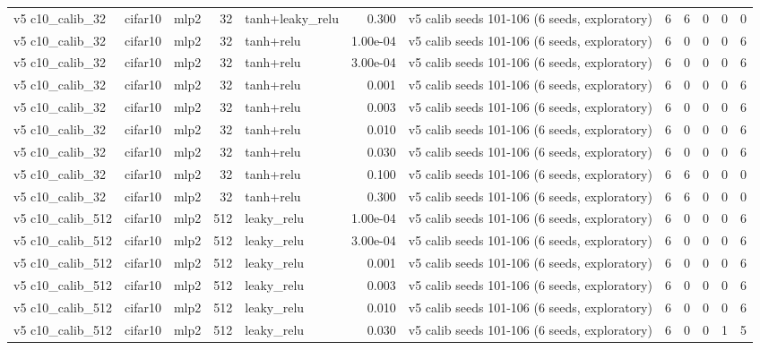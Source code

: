 \begin{table}[htbp]
{\begin{tabular}{@{}lllrlrlrrrrr@{}}
v5 c10\_calib\_32 & cifar10 & mlp2 & 32 & tanh+leaky\_relu & 0.300 & v5 calib seeds 101-106 (6 seeds, exploratory) & 6 & 6 & 0 & 0 & 0 \\
v5 c10\_calib\_32 & cifar10 & mlp2 & 32 & tanh+relu & 1.00e-04 & v5 calib seeds 101-106 (6 seeds, exploratory) & 6 & 0 & 0 & 0 & 6 \\
v5 c10\_calib\_32 & cifar10 & mlp2 & 32 & tanh+relu & 3.00e-04 & v5 calib seeds 101-106 (6 seeds, exploratory) & 6 & 0 & 0 & 0 & 6 \\
v5 c10\_calib\_32 & cifar10 & mlp2 & 32 & tanh+relu & 0.001 & v5 calib seeds 101-106 (6 seeds, exploratory) & 6 & 0 & 0 & 0 & 6 \\
v5 c10\_calib\_32 & cifar10 & mlp2 & 32 & tanh+relu & 0.003 & v5 calib seeds 101-106 (6 seeds, exploratory) & 6 & 0 & 0 & 0 & 6 \\
v5 c10\_calib\_32 & cifar10 & mlp2 & 32 & tanh+relu & 0.010 & v5 calib seeds 101-106 (6 seeds, exploratory) & 6 & 0 & 0 & 0 & 6 \\
v5 c10\_calib\_32 & cifar10 & mlp2 & 32 & tanh+relu & 0.030 & v5 calib seeds 101-106 (6 seeds, exploratory) & 6 & 0 & 0 & 0 & 6 \\
v5 c10\_calib\_32 & cifar10 & mlp2 & 32 & tanh+relu & 0.100 & v5 calib seeds 101-106 (6 seeds, exploratory) & 6 & 6 & 0 & 0 & 0 \\
v5 c10\_calib\_32 & cifar10 & mlp2 & 32 & tanh+relu & 0.300 & v5 calib seeds 101-106 (6 seeds, exploratory) & 6 & 6 & 0 & 0 & 0 \\
v5 c10\_calib\_512 & cifar10 & mlp2 & 512 & leaky\_relu & 1.00e-04 & v5 calib seeds 101-106 (6 seeds, exploratory) & 6 & 0 & 0 & 0 & 6 \\
v5 c10\_calib\_512 & cifar10 & mlp2 & 512 & leaky\_relu & 3.00e-04 & v5 calib seeds 101-106 (6 seeds, exploratory) & 6 & 0 & 0 & 0 & 6 \\
v5 c10\_calib\_512 & cifar10 & mlp2 & 512 & leaky\_relu & 0.001 & v5 calib seeds 101-106 (6 seeds, exploratory) & 6 & 0 & 0 & 0 & 6 \\
v5 c10\_calib\_512 & cifar10 & mlp2 & 512 & leaky\_relu & 0.003 & v5 calib seeds 101-106 (6 seeds, exploratory) & 6 & 0 & 0 & 0 & 6 \\
v5 c10\_calib\_512 & cifar10 & mlp2 & 512 & leaky\_relu & 0.010 & v5 calib seeds 101-106 (6 seeds, exploratory) & 6 & 0 & 0 & 0 & 6 \\
v5 c10\_calib\_512 & cifar10 & mlp2 & 512 & leaky\_relu & 0.030 & v5 calib seeds 101-106 (6 seeds, exploratory) & 6 & 0 & 0 & 1 & 5 \\

\end{tabular}}
\end{table}
